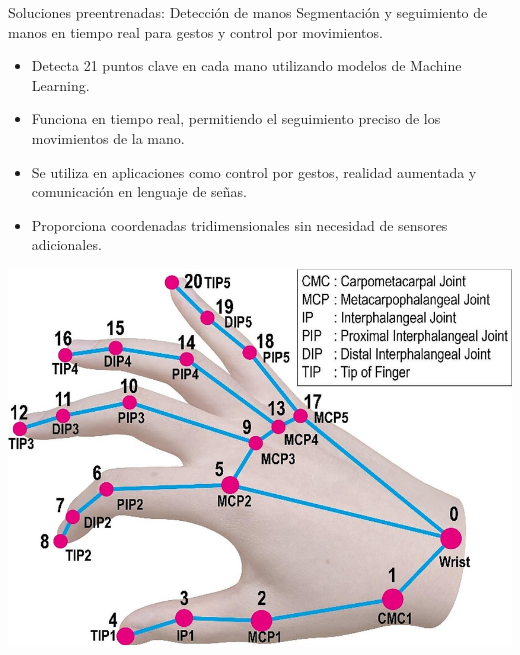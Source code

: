\begin{frame}{Soluciones preentrenadas: Detección de manos}
    Segmentación y seguimiento de manos en tiempo real para gestos y control por movimientos.
   \begin{itemize}
        \item Detecta 21 puntos clave en cada mano utilizando modelos de Machine Learning.
        \item Funciona en tiempo real, permitiendo el seguimiento preciso de los movimientos de la mano.
        \item Se utiliza en aplicaciones como control por gestos, realidad aumentada y comunicación en lenguaje de señas.
        \item Proporciona coordenadas tridimensionales sin necesidad de sensores adicionales.
    \end{itemize}
    \begin{center}
        \includegraphics[width=0.6\linewidth]{01_MediaPipe/hand_landmarks.png}
    \end{center}
\end{frame}



